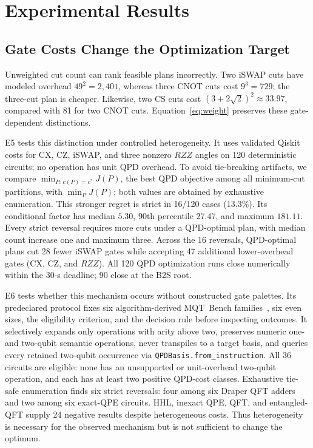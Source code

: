 \documentclass[11pt]{article}
\begin{document}
\section{Experimental Results}

\subsection{Gate Costs Change the Optimization Target}

Unweighted cut count can rank feasible plans incorrectly. Two iSWAP cuts have modeled overhead $49^2=2{,}401$, whereas three CNOT cuts cost $9^3=729$; the three-cut plan is cheaper. Likewise, two CS cuts cost $(3+2\sqrt{2})^2\approx33.97$, compared with 81 for two CNOT cuts. Equation~\eqref{eq:weight} preserves these gate-dependent distinctions.

E5 tests this distinction under controlled heterogeneity. It uses validated Qiskit costs for CX, CZ, iSWAP, and three nonzero $RZZ$ angles on 120 deterministic circuits; no operation has unit QPD overhead. To avoid tie-breaking artifacts, we compare $\min_{P:\,c(P)=c^*}J(P)$, the best QPD objective among all minimum-cut partitions, with $\min_PJ(P)$; both values are obtained by exhaustive enumeration. This stronger regret is strict in 16/120 cases (13.3\%). Its conditional factor has median $5.30$, 90th percentile $27.47$, and maximum $181.11$. Every strict reversal requires more cuts under a QPD-optimal plan, with median count increase one and maximum three. Across the 16 reversals, QPD-optimal plans cut 28 fewer iSWAP gates while accepting 47 additional lower-overhead gates (CX, CZ, and $RZZ$). All 120 QPD optimization runs close numerically within the 30-s deadline; 90 close at the B2S root.

E6 tests whether this mechanism occurs without constructed gate palettes. Its predeclared protocol fixes six algorithm-derived MQT~Bench families~\cite{mqtbench}, six even sizes, the eligibility criterion, and the decision rule before inspecting outcomes. It selectively expands only operations with arity above two, preserves numeric one- and two-qubit semantic operations, never transpiles to a target basis, and queries every retained two-qubit occurrence via \texttt{QPDBasis.from\_instruction}. All 36 circuits are eligible: none has an unsupported or unit-overhead two-qubit operation, and each has at least two positive QPD-cost classes. Exhaustive tie-safe enumeration finds six strict reversals: four among six Draper QFT adders and two among six exact-QPE circuits. HHL, inexact QPE, QFT, and entangled-QFT supply 24 negative results despite heterogeneous costs. Thus heterogeneity is necessary for the observed mechanism but is not sufficient to change the optimum.
\end{document}
